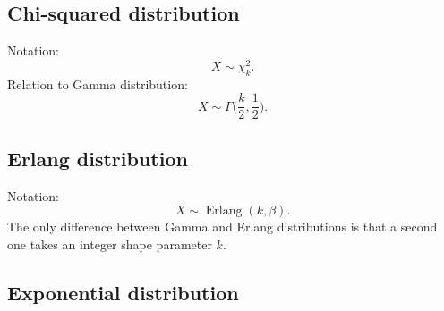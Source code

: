 \documentclass[a4paper,11pt]{article}
\theoremstyle{plain}
\theoremstyle{definition}
\begin{document}
	\subsection{Chi-squared distribution}
	Notation:
	\[
	X \sim \chi_k^2.
	\]
	Relation to Gamma distribution:
	\[
	X \sim \Gamma\bigg( \frac{k}{2}, \frac{1}{2} \bigg).
	\]
	\subsection{Erlang distribution}
	Notation:
	\[
	X \sim \operatorname{Erlang}(k, \beta).
	\]
	The only difference between Gamma and Erlang distributions is that a second one takes an integer shape parameter $k$.
	\subsection{Exponential distribution}
\end{document}
